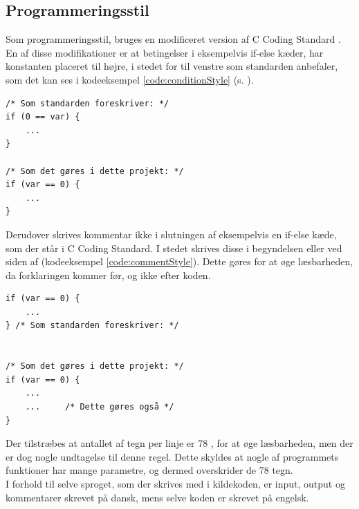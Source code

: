 \subsection*{Programmeringsstil}
Som programmeringsstil, bruges en modificeret version af C Coding Standard \cite{codingstyle}.
En af disse modifikationer er at betingelser i eksempelvis if-else kæder, har konstanten placeret til højre, i stedet for til venstre som standarden anbefaler, som det kan ses i kodeeksempel  \ref{code:conditionStyle} (s. \pageref{code:conditionStyle}).
\begin{listing}[H]
\begin{verbatim}
/* Som standarden foreskriver: */
if (0 == var) {
    ...
}

/* Som det gøres i dette projekt: */
if (var == 0) {
    ...
}
\end{verbatim}
\label{code:conditionStyle}
\end{listing}

Derudover skrives kommentar ikke i slutningen af eksempelvis en if-else kæde, som der står i C Coding Standard. I stedet skrives disse i begyndelsen eller ved siden af (kodeeksempel \ref{code:commentStyle}). Dette gøres for at øge læsbarheden, da forklaringen kommer før, og ikke efter koden.

\begin{listing}[H]
\begin{verbatim}
if (var == 0) {
    ...
} /* Som standarden foreskriver: */


/* Som det gøres i dette projekt: */
if (var == 0) {
    ...
    ...     /* Dette gøres også */
}
\end{verbatim}
\label{code:commentStyle}
\end{listing}

Der tilstræbes at antallet af tegn per linje er 78 \cite{codingstyle}, for at øge læsbarheden, men der er dog nogle undtagelse til denne regel. Dette skyldes at nogle af programmets funktioner har mange parametre, og dermed overskrider de 78 tegn.\\
I forhold til selve sproget, som der skrives med i kildekoden, er input, output og kommentarer skrevet på dansk, mens selve koden er skrevet på engelsk.

